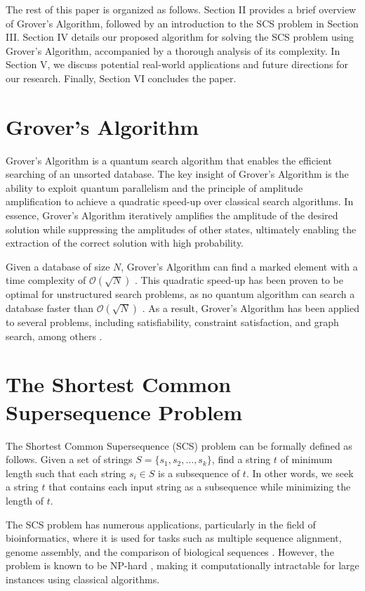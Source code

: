 The rest of this paper is organized as follows. Section II provides a brief overview of Grover's Algorithm, followed by an introduction to the SCS problem in Section III. Section IV details our proposed algorithm for solving the SCS problem using Grover's Algorithm, accompanied by a thorough analysis of its complexity. In Section V, we discuss potential real-world applications and future directions for our research. Finally, Section VI concludes the paper.

\section{Grover's Algorithm}

Grover's Algorithm is a quantum search algorithm that enables the efficient searching of an unsorted database. The key insight of Grover's Algorithm is the ability to exploit quantum parallelism and the principle of amplitude amplification to achieve a quadratic speed-up over classical search algorithms. In essence, Grover's Algorithm iteratively amplifies the amplitude of the desired solution while suppressing the amplitudes of other states, ultimately enabling the extraction of the correct solution with high probability.

Given a database of size $N$, Grover's Algorithm can find a marked element with a time complexity of $\mathcal{O}(\sqrt{N})$ \cite{grover1996fast}. This quadratic speed-up has been proven to be optimal for unstructured search problems, as no quantum algorithm can search a database faster than $\mathcal{O}(\sqrt{N})$ \cite{bennett1997strengths}. As a result, Grover's Algorithm has been applied to several problems, including satisfiability, constraint satisfaction, and graph search, among others \cite{brassard1998quantum}.

\section{The Shortest Common Supersequence Problem}

The Shortest Common Supersequence (SCS) problem can be formally defined as follows. Given a set of strings $S = \{s_1, s_2, \ldots, s_k\}$, find a string $t$ of minimum length such that each string $s_i \in S$ is a subsequence of $t$. In other words, we seek a string $t$ that contains each input string as a subsequence while minimizing the length of $t$.

The SCS problem has numerous applications, particularly in the field of bioinformatics, where it is used for tasks such as multiple sequence alignment, genome assembly, and the comparison of biological sequences \cite{gusfield1997algorithms}. However, the problem is known to be NP-hard \cite{maier1978complexity}, making it computationally intractable for large instances using classical algorithms.

